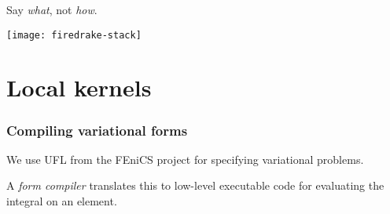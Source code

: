 \documentclass[presentation]{beamer}
\begin{document}
\begin{frame}[standout]
  Say \emph{what}, not \emph{how}.
\end{frame}

\begin{frame}
  \texttt{[image: firedrake-stack]}
\end{frame}

\section{Local kernels}

\begin{frame}
  \frametitle{Compiling variational forms}

  We use UFL \parencite{Alnaes:2014} from the FEniCS project for
  specifying variational problems.

  A \emph{form compiler} translates this to low-level executable code
  for evaluating the integral on an element.

\end{frame}
\end{document}
